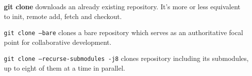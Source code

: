 %

\textbf{git clone} downloads an already existing repository.
It's more or less equivalent to init, remote add, fetch and checkout.

\texttt{git clone --bare} clones a bare repository which serves as an authoritative focal point for collaborative development.

\texttt{git clone --recurse-submodules -j8} clones repository including its submodules, up to eight of them at a time in parallel.

%